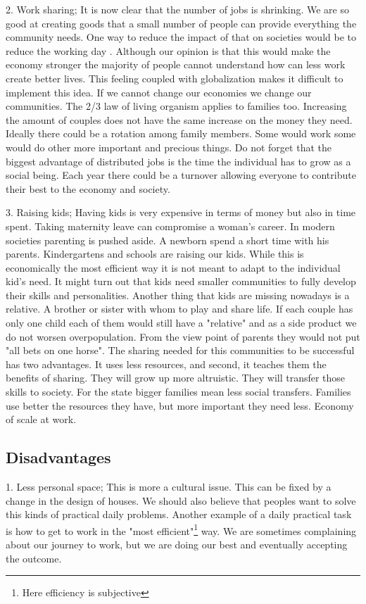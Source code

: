 \documentclass{article}
\begin{document}
2. Work sharing;
It is now clear that the number of jobs is shrinking.
We are so good at creating goods that a small number of people can provide everything the community needs.
One way to reduce the impact of that on societies would be to reduce the working day \cite{4hourday}.
Although our opinion is that this would make the economy stronger the majority of people cannot understand how can less work create better lives.
This feeling coupled with globalization makes it difficult to implement this idea.
If we cannot change our economies we change our communities.
The 2/3 law of living organism applies to families too.
Increasing the amount of couples does not have the same increase on the money they need.
Ideally there could be a rotation among family members.
Some would work some would do other more important and precious things.
Do not forget that the biggest advantage of distributed jobs is the time the individual has to grow as a social being.
Each year there could be a turnover allowing everyone to contribute their best to the economy and society.

3. Raising kids;
Having kids is very expensive in terms of money but also in time spent.
Taking maternity leave can compromise a woman's career.
In modern societies parenting is pushed aside.
A newborn spend a short time with his parents.
Kindergartens and schools are raising our kids.
While this is economically the most efficient way it is not meant to adapt to the individual kid's need.
It might turn out that kids need smaller communities to fully develop their skills and personalities.
Another thing that kids are missing nowadays is a relative.
A brother or sister with whom to play and share life.
If each couple has only one child each of them would still have a "relative" and as a side product we do not worsen overpopulation.
From the view point of parents they would not put "all bets on one horse".
The sharing needed for this communities to be successful has two advantages.
It uses less resources, and second, it teaches them the benefits of sharing.
They will grow up more altruistic.
They will transfer those skills to society.
For the state bigger families mean less social transfers.
Families use better the resources they have, but more important they need less.
Economy of scale at work.

\subsection{Disadvantages}
1. Less personal space;
This is more a cultural issue.
This can be fixed by a change in the design of houses.
We should also believe that peoples want to solve this kinds of practical daily problems.
Another example of a daily practical task is how to get to work in the "most efficient"\footnote{Here efficiency is subjective} way.
We are sometimes complaining about our journey to work, but we are doing our best and  eventually accepting the outcome.
\end{document}
